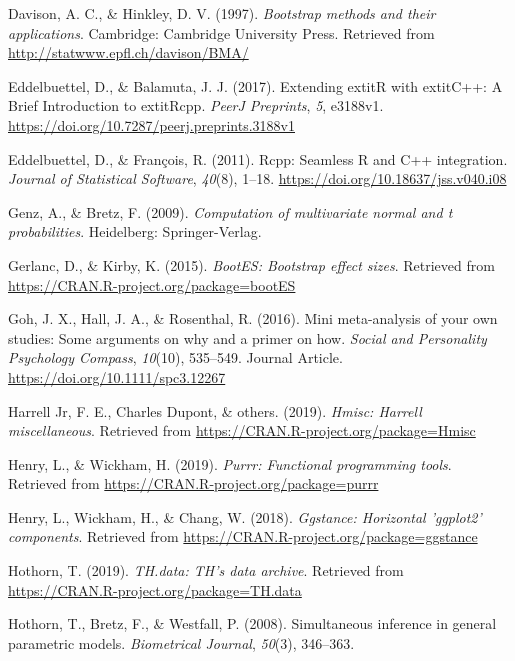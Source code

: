 \documentclass[
  english,
  man]{apa6}
\begin{document}
\leavevmode\hypertarget{ref-R-boot}{}%
Davison, A. C., \& Hinkley, D. V. (1997). \emph{Bootstrap methods and their applications}. Cambridge: Cambridge University Press. Retrieved from \url{http://statwww.epfl.ch/davison/BMA/}

\leavevmode\hypertarget{ref-R-Rcpp_b}{}%
Eddelbuettel, D., \& Balamuta, J. J. (2017). Extending extitR with extitC++: A Brief Introduction to extitRcpp. \emph{PeerJ Preprints}, \emph{5}, e3188v1. \url{https://doi.org/10.7287/peerj.preprints.3188v1}

\leavevmode\hypertarget{ref-R-Rcpp_a}{}%
Eddelbuettel, D., \& François, R. (2011). Rcpp: Seamless R and C++ integration. \emph{Journal of Statistical Software}, \emph{40}(8), 1--18. \url{https://doi.org/10.18637/jss.v040.i08}

\leavevmode\hypertarget{ref-R-mvtnorm}{}%
Genz, A., \& Bretz, F. (2009). \emph{Computation of multivariate normal and t probabilities}. Heidelberg: Springer-Verlag.

\leavevmode\hypertarget{ref-R-bootES}{}%
Gerlanc, D., \& Kirby, K. (2015). \emph{BootES: Bootstrap effect sizes}. Retrieved from \url{https://CRAN.R-project.org/package=bootES}

\leavevmode\hypertarget{ref-Goh_2016_mini}{}%
Goh, J. X., Hall, J. A., \& Rosenthal, R. (2016). Mini meta-analysis of your own studies: Some arguments on why and a primer on how. \emph{Social and Personality Psychology Compass}, \emph{10}(10), 535--549. Journal Article. \url{https://doi.org/10.1111/spc3.12267}

\leavevmode\hypertarget{ref-R-Hmisc}{}%
Harrell Jr, F. E., Charles Dupont, \& others. (2019). \emph{Hmisc: Harrell miscellaneous}. Retrieved from \url{https://CRAN.R-project.org/package=Hmisc}

\leavevmode\hypertarget{ref-R-purrr}{}%
Henry, L., \& Wickham, H. (2019). \emph{Purrr: Functional programming tools}. Retrieved from \url{https://CRAN.R-project.org/package=purrr}

\leavevmode\hypertarget{ref-R-ggstance}{}%
Henry, L., Wickham, H., \& Chang, W. (2018). \emph{Ggstance: Horizontal 'ggplot2' components}. Retrieved from \url{https://CRAN.R-project.org/package=ggstance}

\leavevmode\hypertarget{ref-R-TH.data}{}%
Hothorn, T. (2019). \emph{TH.data: TH's data archive}. Retrieved from \url{https://CRAN.R-project.org/package=TH.data}

\leavevmode\hypertarget{ref-R-multcomp}{}%
Hothorn, T., Bretz, F., \& Westfall, P. (2008). Simultaneous inference in general parametric models. \emph{Biometrical Journal}, \emph{50}(3), 346--363.
\end{document}
